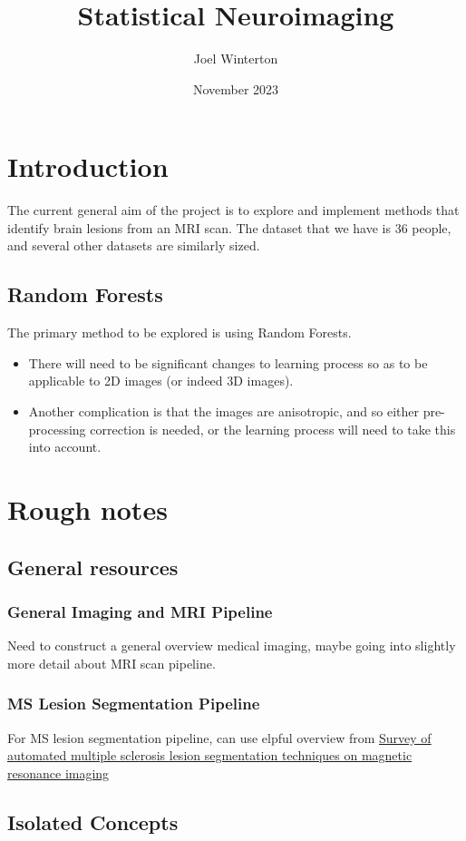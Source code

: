 \documentclass{report}
\title{Statistical Neuroimaging}
\author{Joel Winterton}
\date{November 2023}
\begin{document}
\maketitle
\tableofcontents
\chapter{Introduction}
The current general aim of the project is to explore and implement methods that identify brain lesions from an MRI scan.  The dataset that we have is 36 people, and several other datasets are similarly sized. 

\section{Random Forests}
The primary method to be explored is using Random Forests.
\begin{itemize}
	\item There will need to be significant changes to learning process so as to be applicable to 2D images (or indeed 3D images). 
	\item Another complication is that the images are anisotropic, and so either pre-processing correction is needed, or the learning process will need to take this into account.
\end{itemize}
\chapter{Rough notes}
\section{General resources}
\subsection{General Imaging and MRI Pipeline}
Need to construct a general overview medical imaging, maybe going into slightly more detail about MRI scan pipeline. 
\subsection{MS Lesion Segmentation Pipeline}
For MS lesion segmentation pipeline, can use elpful overview from \href{https://pdf.sciencedirectassets.com/271303/1-s2.0-S0895611118X00081/1-s2.0-S0895611118303227/main.pdf}{Survey of automated multiple sclerosis lesion segmentation
techniques on magnetic resonance imaging}
\section{Isolated Concepts}
\end{document}
